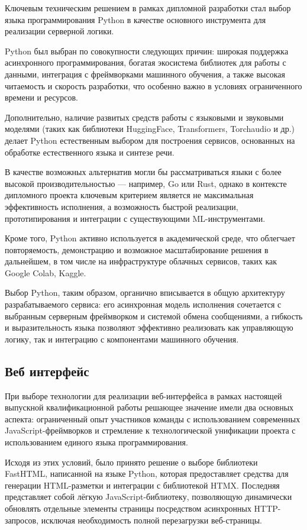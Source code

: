 Ключевым техническим решением в рамках дипломной разработки
стал выбор языка программирования Python
в качестве основного инструмента для реализации серверной логики.

Python был выбран по совокупности следующих причин:
широкая поддержка асинхронного программирования,
богатая экосистема библиотек для работы с данными,
интеграция с фреймворками машинного обучения,
а также высокая читаемость и скорость разработки,
что особенно важно в условиях ограниченного времени и ресурсов.

Дополнительно, наличие развитых средств работы
с языковыми и звуковыми моделями (таких как библиотеки HuggingFace,
Transformers, Torchaudio и др.) делает Python
естественным выбором для построения сервисов,
основанных на обработке естественного языка и синтезе речи.

В качестве возможных альтернатив могли бы рассматриваться
языки с более высокой производительностью — например, Go или Rust,
однако в контексте дипломного проекта ключевым критерием
является не максимальная эффективность исполнения,
а возможность быстрой реализации, прототипирования и интеграции
с существующими ML-инструментами.

Кроме того, Python активно используется в академической среде,
что облегчает повторяемость, демонстрацию и возможное масштабирование решения
в дальнейшем, в том числе на инфраструктуре облачных сервисов,
таких как Google Colab, Kaggle.

Выбор Python, таким образом, органично вписывается
в общую архитектуру разрабатываемого сервиса:
его асинхронная модель исполнения сочетается
с выбранным серверным фреймворком и системой обмена сообщениями,
а гибкость и выразительность языка
позволяют эффективно реализовать как управляющую логику,
так и интеграцию с компонентами машинного обучения.

\subsection{Веб интерфейс}

При выборе технологии для реализации веб-интерфейса
в рамках настоящей выпускной квалификационной работы
решающее значение имели два основных аспекта:
ограниченный опыт участников команды
с использованием современных JavaScript-фреймворков
и стремление к технологической унификации проекта
с использованием единого языка программирования.

Исходя из этих условий, было принято решение
о выборе библиотеки FastHTML, написанной на языке Python,
которая предоставляет средства для генерации HTML-разметки
и интеграции с библиотекой HTMX.
Последняя представляет собой лёгкую JavaScript-библиотеку,
позволяющую динамически обновлять отдельные элементы страницы
посредством асинхронных HTTP-запросов,
исключая необходимость полной перезагрузки веб-страницы.

